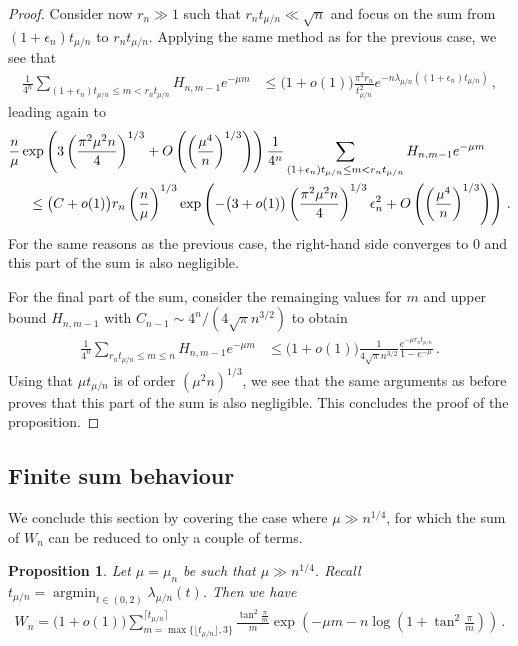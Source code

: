 \documentclass{article}
\DeclareMathOperator*{\argmin}{argmin}
\newcommand{\1}{\mathbbm{1}}								%
\newtheorem{proposition}[theorem]{Proposition}
\theoremstyle{definition}
\numberwithin{equation}{section}
\begin{document}
\begin{proof}
    Consider now $r_n\gg1$ such that $r_nt_{\mu/n}\ll\sqrt{n}$ and focus on the sum from $(1+\epsilon_n)t_{\mu/n}$ to $r_nt_{\mu/n}$.
    Applying the same method as for the previous case, we see that
    \begin{align*}
        \frac{1}{4^n}\sum_{(1+\epsilon_n)t_{\mu/n}\leq m<r_nt_{\mu/n}}H_{n,m-1}e^{-\mu m}&\leq\big(1+o(1)\big)\frac{\pi^2r_n}{t_{\mu/n}^2}e^{-n\lambda_{\mu/n}((1+\epsilon_n)t_{\mu/n})}\,,
    \end{align*}
    leading again to
    \begin{align*}
        &\frac{n}{\mu}\exp\left(3\left(\frac{\pi^2\mu^2n}{4}\right)^{1/3}+O\left(\left(\frac{\mu^4}{n}\right)^{1/3}\right)\right)\frac{1}{4^n}\sum_{(1+\epsilon_n)t_{\mu/n}\leq m<r_nt_{\mu/n}}H_{n,m-1}e^{-\mu m}\\
        &\hspace{0.5cm}\leq\big(C+o(1)\big)r_n\left(\frac{n}{\mu}\right)^{1/3} \exp\left(-\big(3+o(1)\big)\left(\frac{\pi^2\mu^2n}{4}\right)^{1/3}\epsilon_n^2+O\left(\left(\frac{\mu^4}{n}\right)^{1/3}\right)\right)\,.
    \end{align*}
    For the same reasons as the previous case, the right-hand side converges to $0$ and this part of the sum is also negligible.

    For the final part of the sum, consider the remainging values for $m$ and upper bound $H_{n,m-1}$ with $C_{n-1}\sim4^n/(4\sqrt{\pi}n^{3/2})$ to obtain
    \begin{align*}
        \frac{1}{4^n}\sum_{r_nt_{\mu/n}\leq m\leq n}H_{n,m-1}e^{-\mu m}&\leq\big(1+o(1)\big)\frac{1}{4\sqrt{\pi}n^{3/2}}\frac{e^{-\mu r_nt_{\mu/n}}}{1-e^{-\mu}}\,.
    \end{align*}
    Using that $\mu t_{\mu/n}$ is of order $(\mu^2n)^{1/3}$, we see that the same arguments as before proves that this part of the sum is also negligible.
    This concludes the proof of the proposition.
\end{proof}

\subsection{Finite sum behaviour}

We conclude this section by covering the case where $\mu\gg n^{1/4}$, for which the sum of $W_n$ can be reduced to only a couple of terms.

\begin{proposition}\label{prop:W mu-n}
    Let $\mu=\mu_n$ be such that $\mu\gg n^{1/4}$. {Recall $t_{\mu/n}=\argmin_{t \in (0,2)}\lambda_{\mu/n}(t)$.}
    Then we have
    \begin{align*}
        W_n=\big(1+o(1)\big)\sum_{m=\max\{\lfloor t_{\mu/n}\rfloor,3\}}^{\lceil t_{\mu/n}\rceil}\frac{\tan^2\frac{\pi}{m}}{m}\exp\left(-\mu m-n\log\left(1+\tan^2\frac{\pi}{m}\right)\right)\,.
    \end{align*}
\end{proposition}
\end{document}

